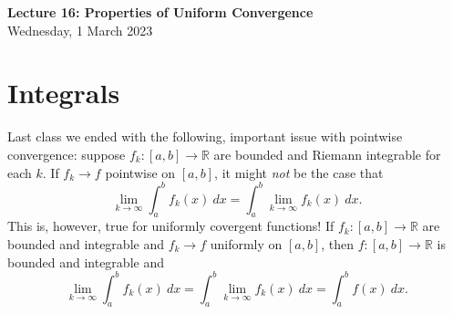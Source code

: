 \documentclass[11pt]{article}
\theoremstyle{definition}
\newcommand{\R}{\mathbb{R}}                      %
\begin{document}
\thispagestyle{empty}

\begin{center}
{\LARGE \bf Lecture 16: Properties of Uniform Convergence}\\
{\large Wednesday, 1 March 2023}\\
\end{center}

\section{Integrals}
Last class we ended with the following, important issue with pointwise convergence: suppose $f_k:[a,b]\to\R$ are bounded and Riemann integrable for each $k$. If $f_k\to f$ pointwise on $[a,b]$, it might \textit{not} be the case that 
$$
\lim_{k\to\infty}\int_a^bf_k(x)~dx=\int_a^b\lim_{k\to\infty} f_k(x)~dx.
$$
This is, however, true for uniformly covergent functions! 
\prop If $f_k:[a,b]\to\R$ are bounded and integrable and $f_k\to f$ uniformly on $[a,b]$, then $f:[a,b]\to \R$ is bounded and integrable and
$$
\lim_{k\to\infty} \int_a^b f_k(x)~dx=\int_a^b \lim_{k\to\infty} f_k(x)~dx = \int_a^b f(x)~dx.
$$
\end{document}
